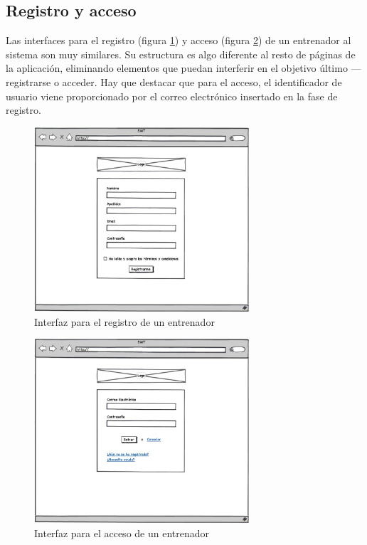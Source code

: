 	
	\subsection{Registro y acceso} %
		\label{sub:registro_y_acceso}
	
		Las interfaces para el registro (figura \ref{fig:interfaz_registro}) y acceso (figura \ref{fig:interfaz_acceso}) de un entrenador al sistema son muy similares. Su estructura es algo diferente al resto de páginas de la aplicación, eliminando elementos que puedan interferir en el objetivo último ---registrarse o acceder. Hay que destacar que para el acceso, el identificador de usuario viene proporcionado por el correo electrónico insertado en la fase de registro.
		
		\begin{figure}[H]
		  \centering
		    \includegraphics[width=8cm]{./eps/p_interfaz/4_Registro.eps}
		  \caption{Interfaz para el registro de un entrenador}
		  \label{fig:interfaz_registro}
		\end{figure}
		
		\begin{figure}[H]
		  \centering
		    \includegraphics[width=8cm]{./eps/p_interfaz/5_Acceder.eps}
		  \caption{Interfaz para el acceso de un entrenador}
		  \label{fig:interfaz_acceso}
		\end{figure}
	
